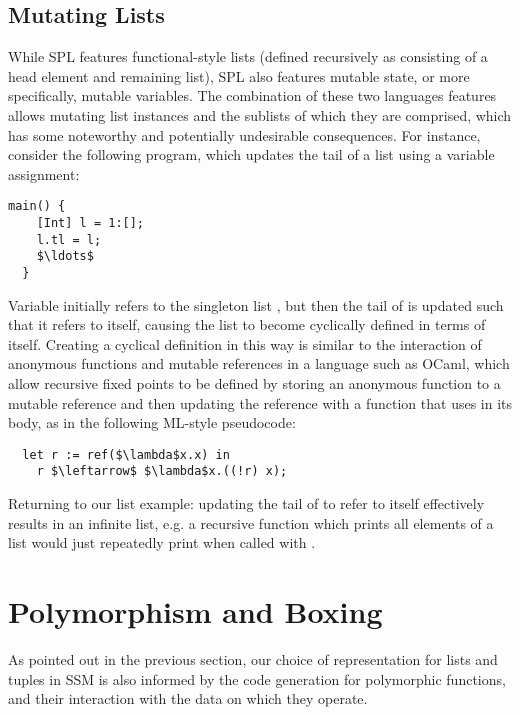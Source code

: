\subsection{Mutating Lists}
While SPL features functional-style lists (defined recursively as consisting of
a head element and remaining list), SPL also features mutable state, or more
specifically, mutable variables.
The combination of these two languages features allows mutating list instances
and the sublists of which they are comprised, which has some noteworthy and
potentially undesirable consequences.
For instance, consider the following program, which updates the tail of a list
using a variable assignment:
%
\begin{lstlisting}[language=spl]
  main() {
    [Int] l = 1:[];
    l.tl = l;
    $\ldots$
  }
\end{lstlisting}

Variable  initially refers to the singleton list , but then the
tail of  is updated such that it refers to  itself, causing the
list to become cyclically defined in terms of itself.
Creating a cyclical definition in this way is similar to the interaction of
anonymous functions and mutable references in a language such as OCaml, which
allow recursive fixed points to be defined by storing an anonymous function to a
mutable reference  and then updating the reference with a function that
uses  in its body, as in the following ML-style pseudocode:
\begin{lstlisting}
  let r := ref($\lambda$x.x) in
    r $\leftarrow$ $\lambda$x.((!r) x);
\end{lstlisting}

Returning to our list example: updating the tail of  to refer to 
itself effectively results in an infinite list, e.g. a recursive function which
prints all elements of a list would just repeatedly print  when called
with .




\section{Polymorphism and Boxing} \label{sec:polymorphism-boxing}

As pointed out in the previous section, our choice of representation for lists
and tuples in SSM is also informed by the code generation for polymorphic
functions, and their interaction with the data on which they operate.

